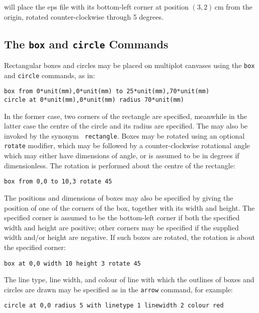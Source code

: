 \noindent will place the eps file with its bottom-left corner at position
$(3,2)$\,cm from the origin, rotated counter-clockwise through 5 degrees.

\subsection{The {\tt box} and {\tt circle} Commands}
\label{sec:rectangle}

Rectangular boxes and circles may be placed on multiplot canvases
using the {\tt box} and {\tt circle} commands, as
in:

\begin{verbatim}
box from 0*unit(mm),0*unit(mm) to 25*unit(mm),70*unit(mm)
circle at 0*unit(mm),0*unit(mm) radius 70*unit(mm)
\end{verbatim}

\noindent In the former case, two corners of the rectangle are specified,
meanwhile in the latter case the centre of the circle and its radius are
specified. The  may also be invoked by the synonym {\tt
rectangle}. Boxes may be rotated using an optional {\tt
rotate} modifier, which may be followed by a counter-clockwise rotational angle
which may either have dimensions of angle, or is assumed to be in degrees if
dimensionless. The rotation is performed about the centre of the rectangle:

\begin{verbatim}
box from 0,0 to 10,3 rotate 45
\end{verbatim}

The positions and dimensions of boxes may also be specified by giving the
position of one of the corners of the box, together with its width and height.
The specified corner is assumed to be the bottom-left corner if both the
specified width and height are positive; other corners may be specified if the
supplied width and/or height are negative. If such boxes are rotated, the
rotation is about the specified corner:

\begin{verbatim}
box at 0,0 width 10 height 3 rotate 45
\end{verbatim}

The line type, line width, and colour of line with which the outlines of boxes
and circles are drawn may be specified as in the {\tt arrow} command, for
example:

\begin{verbatim}
circle at 0,0 radius 5 with linetype 1 linewidth 2 colour red
\end{verbatim}

